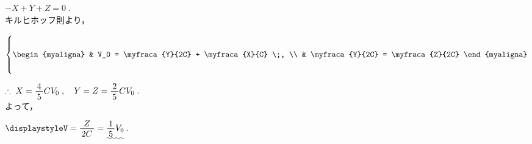 \documentclass[../../../uem_phy_std_a.tex]{subfiles}
\begin{document}
\begin{enumerate}
            \myspaceb%
            $\displaystyle%
                -X + Y + Z = 0 \;.
            $\\
            キルヒホッフ則より，
            
            \myspaceb%
            $\displaystyle%
                \left\{\vphantom{\rule{0pt}{28pt}}
                \begin{myaligna}
                    & V_0 = \myfraca{Y}{2C} +  \myfraca{X}{C} \;, \\
                    & \myfraca{Y}{2C} = \myfraca{Z}{2C}
                \end{myaligna}
                \right.
            $

            \myspaceb%
            $\displaystyle%
                    \therefore \; X = \myfraca{4}{5} CV_0 \;,%
                    \quad Y = Z = \myfraca{2}{5} CV_0 \;.
            $\\            
            よって，
            
            \myspaceb%
            $\displaystyle%
                V = \myfraca{Z}{2C} = \uwave{\myfraca{1}{5} V_0} \;.
            $        
    \end{enumerate}
\end{document}
